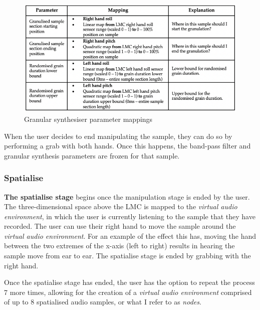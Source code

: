 \begin{figure}
    \centering
    \includegraphics[width=0.8\linewidth]{figures/05-area/areatechnical_param2.png}
    \caption{Granular synthesiser parameter mappings}
    \label{fig: areaparams2}
\end{figure}
When the user decides to end manipulating the sample, they can do so by performing a grab with both hands. Once this happens, the band-pass filter and granular synthesis parameters are frozen for that sample.

\subsubsection{Spatialise}                      \label{sec: area-system-software-spatialise}
\textbf{The spatialise stage} begins once the manipulation stage is ended by the user. The three-dimensional space above the LMC is mapped to the \textit{virtual audio environment}, in which the user is currently listening to the sample that they have recorded. The user can use their right hand to move the sample around the \textit{virtual audio environment}. For an example of the effect this has, moving the hand between the two extremes of the x-axis (left to right) results in hearing the sample move from ear to ear. The spatialise stage is ended by grabbing with the right hand.

Once the spatialise stage has ended, the user has the option to repeat the process 7 more times, allowing for the creation of a \textit{virtual audio environment} comprised of up to 8 spatialised audio samples, or what I refer to as \textit{nodes}. 

